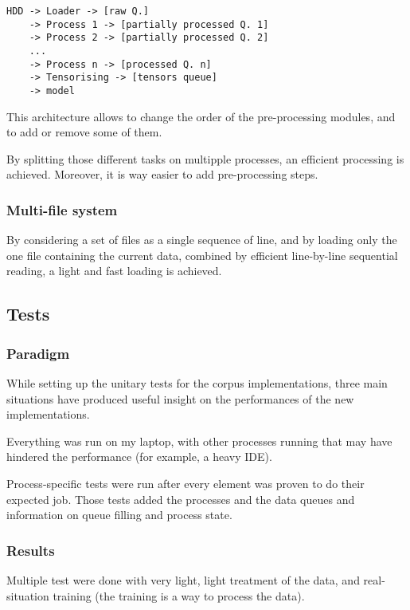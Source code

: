\begin{lstlisting}
HDD -> Loader -> [raw Q.]
    -> Process 1 -> [partially processed Q. 1]
    -> Process 2 -> [partially processed Q. 2]
    ...
    -> Process n -> [processed Q. n]
    -> Tensorising -> [tensors queue]
    -> model
\end{lstlisting}

This architecture allows to change the order of the pre-processing
modules, and to add or remove some of them.

By splitting those different tasks on multipple processes, an efficient
processing is achieved. Moreover, it is way easier to add pre-processing
steps.

\subsubsection{Multi-file system}

By considering a set of files as a single sequence of line, and by
loading only the one file containing the current data, combined by
efficient line-by-line sequential reading, a light and fast loading is
achieved.

\subsection{Tests}

\subsubsection{Paradigm}

While setting up the unitary tests for the corpus implementations, three
main situations have produced useful insight on the performances of the
new implementations.

Everything was run on my laptop, with other processes running that may
have hindered the performance (for example, a heavy IDE).

Process-specific tests were run after every element was proven to do
their expected job. Those tests added the processes and the data queues
and information on queue filling and process state.

\subsubsection{Results}

Multiple test were done with very light, light treatment of the data,
and real-situation training (the training is a way to process the data).

